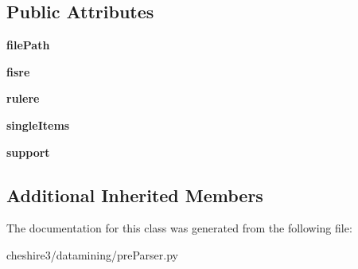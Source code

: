 \subsection*{Public Attributes}
\begin{DoxyCompactItemize}
\item 
\hypertarget{classcheshire3_1_1datamining_1_1pre_parser_1_1_fimi1_pre_parser_a4f652854d83cb9da4beceb3f64c495bd}{{\bfseries file\-Path}}\label{classcheshire3_1_1datamining_1_1pre_parser_1_1_fimi1_pre_parser_a4f652854d83cb9da4beceb3f64c495bd}

\item 
\hypertarget{classcheshire3_1_1datamining_1_1pre_parser_1_1_fimi1_pre_parser_a12e698e7d9501e5d698ac75f43879772}{{\bfseries fisre}}\label{classcheshire3_1_1datamining_1_1pre_parser_1_1_fimi1_pre_parser_a12e698e7d9501e5d698ac75f43879772}

\item 
\hypertarget{classcheshire3_1_1datamining_1_1pre_parser_1_1_fimi1_pre_parser_a992fc385cfa3985307fa3d9e1d466374}{{\bfseries rulere}}\label{classcheshire3_1_1datamining_1_1pre_parser_1_1_fimi1_pre_parser_a992fc385cfa3985307fa3d9e1d466374}

\item 
\hypertarget{classcheshire3_1_1datamining_1_1pre_parser_1_1_fimi1_pre_parser_a28baf29708d094f3358e4b387cd2283f}{{\bfseries single\-Items}}\label{classcheshire3_1_1datamining_1_1pre_parser_1_1_fimi1_pre_parser_a28baf29708d094f3358e4b387cd2283f}

\item 
\hypertarget{classcheshire3_1_1datamining_1_1pre_parser_1_1_fimi1_pre_parser_ada681cef1cee264f906356cb4549ae84}{{\bfseries support}}\label{classcheshire3_1_1datamining_1_1pre_parser_1_1_fimi1_pre_parser_ada681cef1cee264f906356cb4549ae84}

\end{DoxyCompactItemize}
\subsection*{Additional Inherited Members}


The documentation for this class was generated from the following file\-:\begin{DoxyCompactItemize}
\item 
cheshire3/datamining/pre\-Parser.\-py\end{DoxyCompactItemize}
